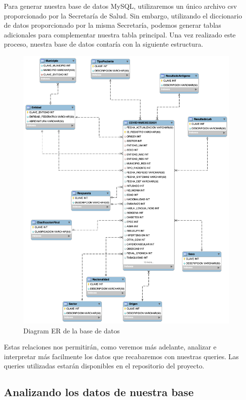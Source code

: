 \documentclass[11pt]{article}
\begin{document}
Para generar nuestra base de datos MySQL, utilizaremos un único archivo
csv proporcionado por la Secretaría de Salud. Sin embargo, utilizando el
diccionario de datos proporcionado por la misma Secretaría, podemos
generar tablas adicionales para complementar nuestra tabla principal.
Una vez realizado este proceso, nuestra base de datos contaría con la
siguiente estructura.

\begin{figure}
\centering
\includegraphics{./img/diagrama.png}
\caption{Diagram ER de la base de datos}
\end{figure}

Estas relaciones nos permitirán, como veremos más adelante, analizar e
interpretar más facilmente los datos que recabaremos con nuestras
queries. Las queries utilizadas estarán disponibles en el repositorio
del proyecto.

\hypertarget{analizando-los-datos-de-nuestra-base}{%
\subsection{Analizando los datos de nuestra
base}\label{analizando-los-datos-de-nuestra-base}}
\end{document}
